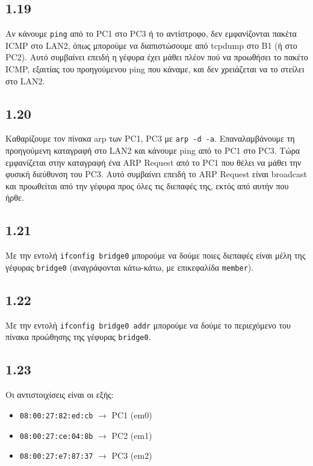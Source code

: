 \documentclass[a4paper, 12pt]{article}
\begin{document}
	\subsection*{1.19}
		Αν κάνουμε \verb|ping| από το PC1 στο PC3 ή το αντίστροφο, δεν εμφανίζονται πακέτα ICMP στο LAN2, όπως μπορούμε να διαπιστώσουμε από tcpdump στο B1 (ή στο PC2). Αυτό συμβαίνει επειδή η γέφυρα έχει μάθει πλέον πού να προωθήσει το πακέτο ICMP, εξαιτίας του προηγούμενου ping που κάναμε, και δεν χρειάζεται να το στείλει στο LAN2.
	
	\subsection*{1.20}
		Καθαρίζουμε τον πίνακα arp των PC1, PC3 με \verb|arp -d -a|. Επαναλαμβάνουμε τη προηγούμενη καταγραφή στο LAN2 και κάνουμε ping από το PC1 στο PC3. Τώρα εμφανίζεται στην καταγραφή ένα ARP Request από το PC1 που θέλει να μάθει την φυσική διεύθυνση του PC3. Αυτό συμβαίνει επειδή το ARP Request είναι broadcast και προωθείται από την γέφυρα προς όλες τις διεπαφές της, εκτός από αυτήν που ήρθε.
	
	\subsection*{1.21}
		Με την εντολή \verb|ifconfig bridge0| μπορούμε να δούμε ποιες διεπαφές είναι μέλη της γέφυρας \verb|bridge0| (αναγράφονται κάτω-κάτω, με επικεφαλίδα \verb|member|).
	
	\subsection*{1.22}
		Με την εντολή \verb|ifconfig bridge0 addr| μπορούμε να δούμε το περιεχόμενο του πίνακα προώθησης της γέφυρας \verb|bridge0|.
	
	\subsection*{1.23}
		Οι αντιστοιχίσεις είναι οι εξής: 
		
		\begin{itemize}
			\item \verb|08:00:27:82:ed:cb| $\rightarrow$ PC1 (em0)
			\item \verb|08:00:27:ce:04:8b| $\rightarrow$ PC2 (em1)
			\item \verb|08:00:27:e7:87:37| $\rightarrow$ PC3 (em2)
		\end{itemize}
	
\end{document}
